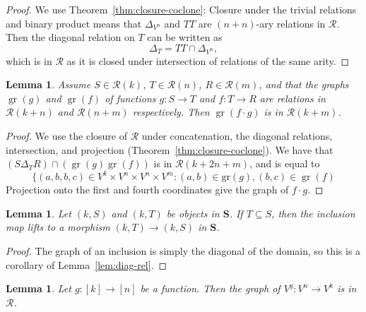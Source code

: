 \documentclass[11pt, a4paper, twoside,leqno]{amsart}
\newcommand{\cat}[1]{\mathbf{#1}}
\numberwithin{equation}{section}
\theoremstyle{plain}
\newtheorem{Lemma}[Thm]{Lemma}
\theoremstyle{definition}
\DeclareMathOperator{\gr}{gr}
\begin{document}
\begin{proof}
  We use Theorem~\ref{thm:closure-coclone}: Closure under the trivial
  relations and binary product means that \(\Delta_{V^{n}}\) and \(T T\) are \((n+n)\)-ary relations in
  \(\mathscr{R}\). Then the diagonal relation on \(T\) can be written as
  \begin{equation}
    \label{eq:13}
    \Delta_{T} = T T \cap \Delta_{V^{n}},
  \end{equation}
  which is in \(\mathscr{R}\) as it is closed under intersection of relations of the same arity.  %
\end{proof}



\begin{Lemma}
  \label{lem:27}
  Assume \(S \in \mathscr{R}(k)\), \(T \in \mathscr{R}(n)\), \(R \in
  \mathscr{R}(m)\), and that the
  graphs \(\gr (g)\) and \(\gr (f)\) of functions \(g \colon S
  \rightarrow T\) and \(f \colon T \rightarrow R\) are relations in
  \(\mathscr{R}(k+n)\) and \(\mathscr{R}(n+m)\) respectively. Then
  \(\gr( f \cdot g)\) is in \(\mathscr{R}(k+m) 
  \).
\end{Lemma}

\begin{proof}
  We use the closure of \(\mathscr{R} 
  \) under concatenation, the diagonal relations, intersection, and
  projection (Theorem~\ref{thm:closure-coclone}). We have that 
  \( (S \Delta_{T}  R) \cap (\gr (g)  \gr (f)) \) is
  in \(\mathscr{R} (k+2n+m)
  \), and is equal to
  \begin{equation*}
    \label{eq:13}
    \{(a,b,b,c) \in V^k \times V^n \times V^n \times V^m : (a,b) \in \mathrm{gr}(g), (b,c) \in \gr(f)
  \end{equation*}
  Projection onto the first and fourth coordinates give the graph of
  \(f\cdot g\).
\end{proof}


\begin{Lemma}
  \label{lem:inclusion-morphisms-cc}
  Let \((k,S)\) and \((k,T)\) be objects in \(\cat{S}\). If
  \(T\subseteq S\), then the inclusion map lifts to a morphism \((k,T) \rightarrow
  (k,S)\) in \(\cat{S}\).
\end{Lemma}

\begin{proof}
  The graph of an inclusion is simply the diagonal of the domain, so this is a corollary of Lemma~\ref{lem:diag-rel}.
\end{proof}

\begin{Lemma}
  \label{lem:gr-functions-powers}
  Let \(g \colon [k] \rightarrow [n]\) be a function. Then
  the graph of \(V^{g} \colon V^{n} \rightarrow V^{k}\) is in \(\mathscr{R}\).
\end{Lemma}
\end{document}
